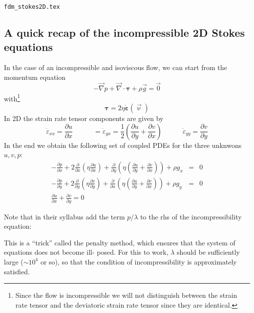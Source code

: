\begin{flushright} {\tiny {\color{gray} \tt fdm\_stokes2D.tex}} \end{flushright}

\subsection{A quick recap of the incompressible 2D Stokes equations}

In the case of an incompressible and isoviscous flow, we can start  from the momentum equation
\begin{equation}
-\vec\nabla p + \vec\nabla \cdot {\bm \tau} + \rho \vec{g} = \vec{0}
\end{equation}
with\footnote{Since the flow is incompressible we will not distinguish
between the strain rate tensor and the deviatoric strain rate tensor 
since they are identical.} 
\begin{equation}
{\bm \tau} = 2 \eta \dot{\bm \varepsilon}(\vec\upnu)
\end{equation}
In 2D the strain rate tensor components are given by
\[
\dot{\varepsilon}_{xx}=\frac{\partial u}{\partial x}
\quad\quad\quad
=\dot{\varepsilon}_{yx}
=\frac{1}{2} \left( \frac{\partial u}{\partial y} + \frac{\partial v}{\partial x} \right)
\quad\quad\quad
\dot{\varepsilon}_{yy}=\frac{\partial v}{\partial y}
\]
In the end we obtain the following set of coupled PDEs for the three 
unknwons $u,v,p$:
\begin{eqnarray}
-\frac{\partial p}{\partial x}  
+ 2 \frac{\partial }{\partial x} \left(\eta \frac{\partial u}{\partial x}  \right) 
+\frac{\partial}{\partial y}\left(\eta (\frac{\partial u}{\partial y}+\frac{\partial v}{\partial x}) \right)
+  \rho g_x &=&0 \\
-\frac{\partial p}{\partial y}  
+ 2 \frac{\partial }{\partial y} \left(\eta \frac{\partial v}{\partial y}  \right) 
+\frac{\partial}{\partial x}\left(\eta (\frac{\partial u}{\partial y}+\frac{\partial v}{\partial x}) \right)
+  \rho g_y  &=& 0 \\
\frac{\partial u}{\partial x} + \frac{\partial v}{\partial y}  = 0 
\end{eqnarray}

Note that in their syllabus \textcite{beka} add the term $p/\lambda$ to the rhs
of the incompressibility equation: 
\begin{displayquote}
{\color{darkgray}
This is a ``trick'' called
the penalty method, which ensures that the system of equations does not become ill-
posed. For this to work, $\lambda$ should be sufficiently large 
($\sim 10^4$ or so), so that the condition
of incompressibility is approximately satisfied.}
\end{displayquote} 


